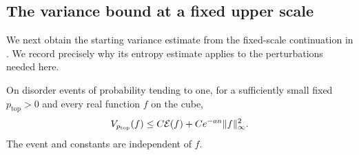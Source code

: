 \subsection{The variance bound at a fixed upper scale}

We next obtain the starting variance estimate from the fixed-scale
continuation in \cite[Section~19.4]{CM}. We record precisely why its
entropy estimate applies to the perturbations needed here.

\begin{lemma}\label{lem:variance-start}
On disorder events of probability tending to one, for a sufficiently
small fixed $p_{\mathrm{top}}>0$ and every real function $f$ on the cube,
\[
 V_{p_{\mathrm{top}}}(f)
 \le C\mathcal E(f)+Ce^{-a n}\|f\|_\infty^2.
\]
The event and constants are independent of $f$.
\end{lemma}

